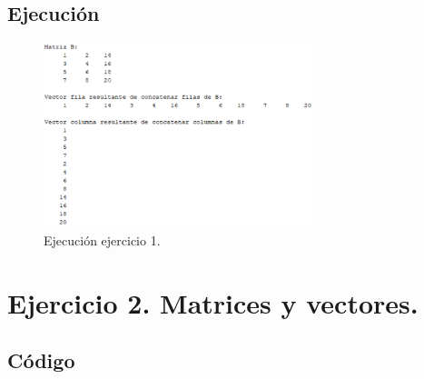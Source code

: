 \documentclass[a4paper, 12pt]{article}
\begin{document}
	\subsection{Ejecución}
	\begin{figure}[htp!]
		\centering
		\includegraphics[width=0.7\textwidth]{figures/ejc1.png}
		\caption{Ejecución ejercicio 1.}
	\end{figure}
	\newpage
	
	\section{Ejercicio 2. Matrices y vectores.}
	
	\subsection{Código}
	\inputminted[fontsize=\scriptsize, linenos, breaklines=true, xleftmargin=0.75cm, frame=lines]{matlab}{code/Ejercicio2.m}
	\newpage
\end{document}
